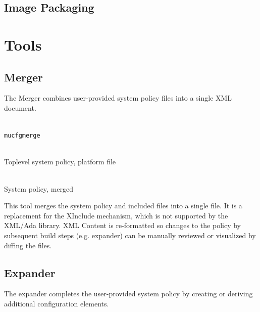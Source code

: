 \documentclass[a4paper,twoside,titlepage]{article}
\begin{document}
\subsection{Image Packaging}

\section{Tools}
\label{sec:tools}

\subsection{Merger}
\label{sec:tools-merger}
The Merger combines user-provided system policy files into a single XML
document.

\begin{description} \itemsep1pt \parskip0pt
	\item[Name] \hfill \\
		\texttt{mucfgmerge}
	\item[Input] \hfill \\
		Toplevel system policy, platform file
	\item[Output] \hfill \\
		System policy, merged
\end{description}

This tool merges the system policy and included files into a single file. It is
a replacement for the XInclude mechanism, which is not supported by the XML/Ada
library. XML Content is re-formatted so changes to the policy by subsequent
build steps (e.g. expander) can be manually reviewed or visualized by diffing
the files.

\subsection{Expander}
\label{sec:tools-expander}
The expander completes the user-provided system policy by creating or deriving
additional configuration elements.
\end{document}
